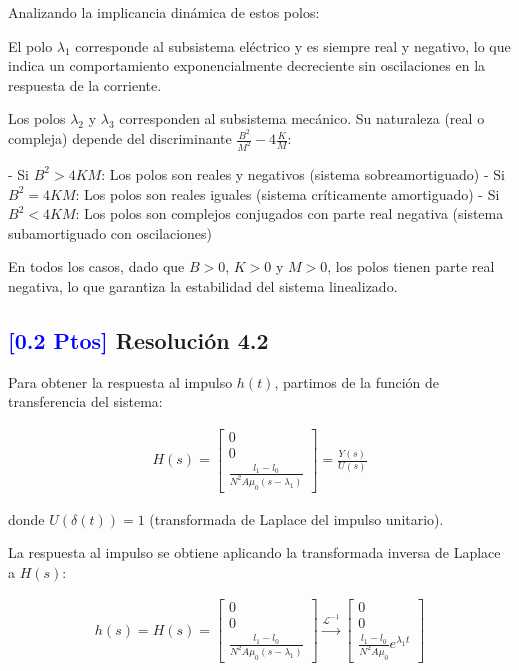 \documentclass[
  11pt,
  letterpaper,
   addpoints,
   answers
  ]{exam}
\begin{document}
\begin{solution}
Analizando la implicancia dinámica de estos polos:

El polo $\lambda_1$ corresponde al subsistema eléctrico y es siempre real y negativo, lo que indica un comportamiento exponencialmente decreciente sin oscilaciones en la respuesta de la corriente.

Los polos $\lambda_2$ y $\lambda_3$ corresponden al subsistema mecánico. Su naturaleza (real o compleja) depende del discriminante $\frac{B^2}{M^2} - 4\frac{K}{M}$:

- Si $B^2 > 4KM$: Los polos son reales y negativos (sistema sobreamortiguado)
- Si $B^2 = 4KM$: Los polos son reales iguales (sistema críticamente amortiguado)  
- Si $B^2 < 4KM$: Los polos son complejos conjugados con parte real negativa (sistema subamortiguado con oscilaciones)

En todos los casos, dado que $B > 0$, $K > 0$ y $M > 0$, los polos tienen parte real negativa, lo que garantiza la estabilidad del sistema linealizado.

\subsection*{\textcolor{blue}{[0.2 Ptos]} Resolución 4.2}

Para obtener la respuesta al impulso $h(t)$, partimos de la función de transferencia del sistema:

\begin{align}
H(s) = \begin{bmatrix}
0 \\
0 \\
\frac{l_1 - l_0}{N^2A\mu_0(s - \lambda_1)}
\end{bmatrix} = \frac{Y(s)}{U(s)}
\end{align}

donde $U(\delta(t)) = 1$ (transformada de Laplace del impulso unitario).

La respuesta al impulso se obtiene aplicando la transformada inversa de Laplace a $H(s)$:

\begin{align}
h(s) = H(s) = \begin{bmatrix}
0 \\
0 \\
\frac{l_1 - l_0}{N^2A\mu_0(s - \lambda_1)}
\end{bmatrix} \xrightarrow{\mathcal{L}^{-1}} \begin{bmatrix}
0 \\
0 \\
\frac{l_1 - l_0}{N^2A\mu_0} e^{\lambda_1 t}
\end{bmatrix}
\end{align}


\end{solution}
\end{document}
